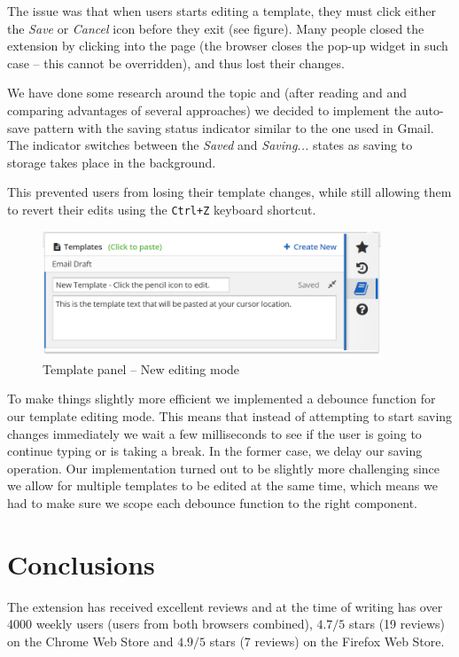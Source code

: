 \documentclass[bsc,frontabs,twoside,singlespacing,parskip,deptreport]{infthesis}
\begin{document}
The issue was that when users starts editing a template, they must click either the \textit{Save} or \textit{Cancel} icon before they exit (see figure). Many people closed the extension by clicking into the page (the browser closes the pop-up widget in such case -- this cannot be overridden), and thus lost their changes.

We have done some research around the topic and (after reading \cite{A26} and \cite{A27} and comparing advantages of several approaches) we decided to implement the auto-save pattern with the saving status indicator similar to the one used in Gmail. The indicator switches between the \textit{Saved} and \textit{Saving...} states as saving to storage takes place in the background. 

This prevented users from losing their template changes, while still allowing them to revert their edits using the \texttt{Ctrl+Z} keyboard shortcut.

\begin{figure}[h]
\centering
\includegraphics[width=0.9\textwidth]{../docs/template-edit-mode.png}
\caption{Template panel -- New editing mode}
\end{figure}

To make things slightly more efficient we implemented a debounce function \cite{A28} for our template editing mode. This means that instead of attempting to start saving changes immediately we wait a few milliseconds to see if the user is going to continue typing or is taking a break. In the former case, we delay our saving operation. Our implementation turned out to be slightly more challenging since we allow for multiple templates to be edited at the same time, which means we had to make sure we scope each debounce function to the right component.

\chapter{Conclusions}
The extension has received excellent reviews and at the time of writing has over 4000 weekly users (users from both browsers combined), $4.7/5$ stars (19 reviews) on the Chrome Web Store and $4.9/5$ stars (7 reviews) on the Firefox Web Store.
\end{document}
